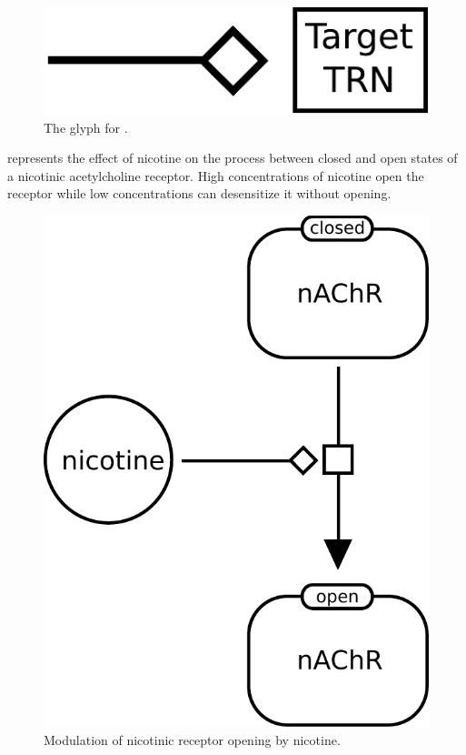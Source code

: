 \begin{figure}[H]
  \centering
  \includegraphics[scale = 0.5]{images/modulation}
  \caption{The \PD glyph for .}
  \label{fig:modulation}
\end{figure}

 represents the effect of nicotine on the process between closed and open states of a nicotinic acetylcholine receptor. High concentrations of nicotine open the receptor while low concentrations can desensitize it without opening. 

\begin{figure}[H]
  \centering
  \includegraphics[scale = 0.5]{examples/modulation-nAChR}
  \caption{Modulation of nicotinic receptor opening by nicotine.}
  \label{fig:modul-nico}
\end{figure}

